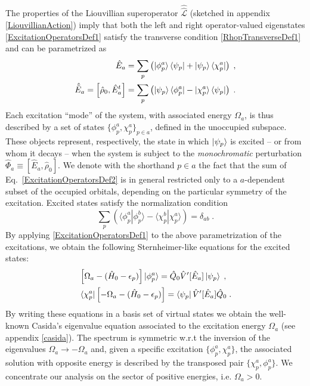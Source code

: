 \documentclass[reprint,aps,prb]{revtex4-1}
\newcommand{\eps}{\epsilon}
\newcommand{\be}{\begin{equation}}
\newcommand{\ee}{\end{equation}}
\newcommand{\nn}{\notag}
\newcommand{\lb}{\label}
\newcommand{\op}[1]{\hat {#1}}
\newcommand{\sop}[1]{\op{\op {#1}}}
\newcommand{\commutator}[2]{\left[ {#1} , {#2} \right]}
\newcommand{\brket}[2]{\langle  #1 | #2 \rangle} %
\newcommand{\dmnot}{\op{\rho}_0}
\newcommand{\hnot}{\op{H}_0}
\newcommand{\Liouv}{\sop{\mathcal L}}
\begin{document}
The properties of the Liouvillian superoperator $\Liouv$ (sketched in appendix \ref{LiouvillianAction}) imply that both the left and right operator-valued
eigenstates \eqref{ExcitationOperatorsDef1} satisfy the transverse condition \eqref{RhopTransverseDef1} and can be parametrized as
\begin{align}\lb{ExcitationOperatorsDef2}
\op E_a &= \sum_p \left( \ket{\phi^a_p}\bra{\psi_p} + \ket{\psi_p} \bra{\chi^a_p}\right)\;, \nn \\
\op{\tilde E}_a = \commutator{\dmnot}{\op E^t_a} &= \sum_p \left( \ket{\psi_p}\bra{\phi^a_p} - \ket{\chi^a_p} \bra{\psi_p}\right)\;.
\end{align}
Each excitation ``mode'' of the system, with associated energy $\Omega_a$, is thus described by a set of states $\{\phi^a_p,\chi^a_p\}_{p \in a}$, defined in the unoccupied subspace. These objects represent, respectively, the state in which $\ket{\psi_p}$ is excited -- or from whom it decays -- when the system is subject to the \emph{monochromatic} perturbation $\op \Phi_a \equiv \commutator{\op E_a}{\dmnot}$. We denote with the shorthand $p \in a$ the fact that the sum of Eq.~\eqref{ExcitationOperatorsDef2} is in general restricted only to a $a$-dependent subset of the occupied orbitals, depending on the particular symmetry
of the excitation. Excited states  satisfy the normalization condition
\be\lb{ExcitedStateOrthNormDef1}
\sum_p \left(\brket{\phi_p^a}{\phi_p^b} - \brket{\chi_p^b}{\chi_p^a}\right) = \delta_{ab} \;.
\ee
By applying \eqref{ExcitationOperatorsDef1} to the above parametrization
of the excitations, we obtain the following Sternheimer-like equations for the excited states:
\begin{align}\lb{ExcitationOperatorsDef3}
&\left[\Omega_a-(\hnot - \eps_p)\right] \ket{\phi_p^a} = \op Q_0 \op V'[\op E_a] \ket{\psi_p} \;, \nn\\
&\bra{\chi_p^a}\left[-\Omega_a-(\hnot - \eps_p)\right] = \bra{\psi_p} \op V'[\op E_a] \op Q_0  \;.
\end{align}
By writing these equations in a basis set of virtual states we obtain the well-known Casida's eigenvalue equation\cite{CasidaBook}
associated to the excitation energy $\Omega_a$ (see appendix \ref{casida}).
The spectrum is symmetric w.r.t the inversion of the eigenvalues $\Omega_a \rightarrow -\Omega_a$ and, given a specific excitation $\{\phi^a_p,\chi^a_p\}$,
the associated solution with opposite energy is described by the transposed pair $\{\chi^a_p,\phi^a_p\}$.
We concentrate our analysis on the sector of positive energies, i.e. $\Omega_a > 0$.
\end{document}
